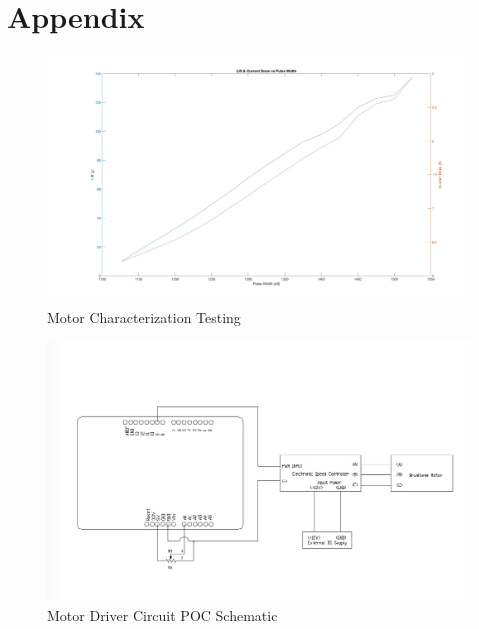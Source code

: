 \section{Appendix}

\begin{figure}[h]
  \centering
  \includegraphics[scale=0.45]{Motor_Characterization.jpg}
  \caption{Motor Characterization Testing}
  \label{fig:Motor_Char}
\end{figure}

\begin{figure}[h]
  \centering
  \includegraphics[scale=0.45]{Motor_Driving_Schematic.jpg}
  \caption{Motor Driver Circuit POC Schematic}
  \label{fig:Motor_Drive_Schem}
\end{figure}

